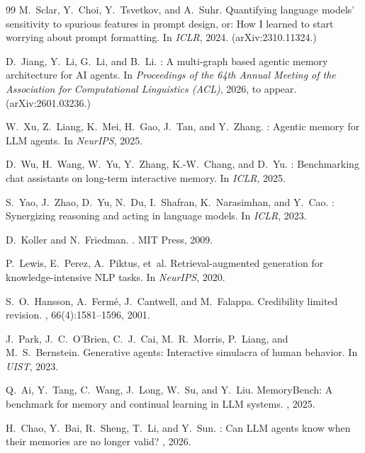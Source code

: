 \documentclass{article}
\theoremstyle{definition}
\begin{document}
{\begin{thebibliography}{99}
M.~Sclar, Y.~Choi, Y.~Tsvetkov, and A.~Suhr.
\newblock Quantifying language models' sensitivity to spurious features in
  prompt design, or: How I learned to start worrying about prompt
  formatting.
\newblock In {\em ICLR}, 2024. (arXiv:2310.11324.)

D.~Jiang, Y.~Li, G.~Li, and B.~Li.
: A multi-graph based agentic memory architecture for
  {AI} agents.
\newblock In {\em Proceedings of the 64th Annual Meeting of the
  Association for Computational Linguistics (ACL)}, 2026, to appear.
  (arXiv:2601.03236.)

W.~Xu, Z.~Liang, K.~Mei, H.~Gao, J.~Tan, and Y.~Zhang.
: Agentic memory for {LLM} agents.
\newblock In {\em NeurIPS}, 2025.

D.~Wu, H.~Wang, W.~Yu, Y.~Zhang, K.-W.~Chang, and D.~Yu.
: Benchmarking chat assistants on long-term
  interactive memory.
\newblock In {\em ICLR}, 2025.

S.~Yao, J.~Zhao, D.~Yu, N.~Du, I.~Shafran, K.~Narasimhan, and Y.~Cao.
: Synergizing reasoning and acting in language models.
\newblock In {\em ICLR}, 2023.

D.~Koller and N.~Friedman.
.
\newblock MIT Press, 2009.

P.~Lewis, E.~Perez, A.~Piktus, et~al.
\newblock Retrieval-augmented generation for knowledge-intensive {NLP}
  tasks.
\newblock In {\em NeurIPS}, 2020.

S.~O.~Hansson, A.~Ferm\'e, J.~Cantwell, and M.~Falappa.
\newblock Credibility limited revision.
, 66(4):1581--1596, 2001.

J.~Park, J.~C.~O'Brien, C.~J.~Cai, M.~R.~Morris, P.~Liang, and
  M.~S.~Bernstein.
\newblock Generative agents: Interactive simulacra of human behavior.
\newblock In {\em UIST}, 2023.

Q.~Ai, Y.~Tang, C.~Wang, J.~Long, W.~Su, and Y.~Liu.
\newblock Memory{B}ench: A benchmark for memory and continual learning
  in {LLM} systems.
, 2025.

H.~Chao, Y.~Bai, R.~Sheng, T.~Li, and Y.~Sun.
: Can {LLM} agents know when their memories are no longer
  valid?
, 2026.


\end{thebibliography}}
\end{document}
